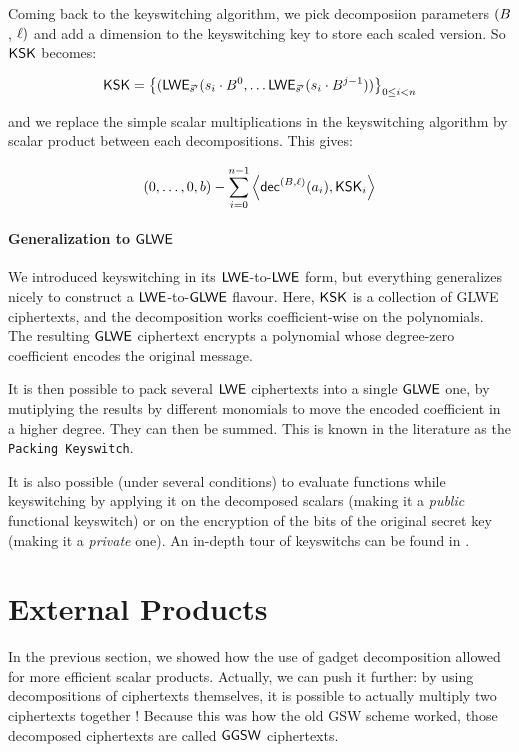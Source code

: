 Coming back to the keyswitching algorithm, we pick decomposiion parameters $(B$, $\ell)$ and add a dimension to the keyswitching key to store each scaled version. So $\textsf{KSK}$ becomes:

\[
	\textsf{KSK} = \left \lbrace ( \textsf{LWE}_{\vec s'} (s_i \cdot B^0, \dots  \textsf{LWE}_{\vec s'} (s_i \cdot B^{j-1}) ) \right \rbrace_{0 \le i < n}
\]


and we replace the simple scalar multiplications in the keyswitching algorithm by scalar product between each decompositions. This gives:

\[
	(0, \dots, 0, b) - \sum_{i=0}^{n-1} \left \langle \textsf{dec}^{(B, \ell)}(a_i), \textsf{KSK}_i \right \rangle
\]




\paragraph{Generalization to $\textsf{GLWE}$}


We introduced keyswitching in its $\textsf{LWE}$-to-$\textsf{LWE}$ form, but everything generalizes nicely to construct a $\textsf{LWE}$-to-$\textsf{GLWE}$ flavour. Here, $\textsf{KSK}$ is a collection of GLWE ciphertexts, and the decomposition works coefficient-wise on the polynomials. The resulting $\textsf{GLWE}$ ciphertext encrypts a polynomial whose degree-zero coefficient encodes the original message.

It is then possible to pack several $\textsf{LWE}$ ciphertexts into a single $\textsf{GLWE}$ one, by mutiplying the results by different monomials to move the encoded coefficient in a higher degree. They can then be summed. This is known in the literature as the \texttt{Packing Keyswitch}.

It is also possible (under several conditions) to evaluate functions while keyswitching by applying it on the decomposed scalars (making it a \textit{public} functional keyswitch) or on the encryption of the bits of the original secret key (making it a \textit{private} one). An in-depth tour of keyswitchs can be found in \cite{these_tap}.


\section{External Products}
\label{sec:external_products}

In the previous section, we showed how the use of gadget decomposition allowed for more efficient scalar products. Actually, we can push it further: by using decompositions of ciphertexts themselves, it is possible to actually multiply two ciphertexts together ! Because this was how the old GSW scheme \cite{C:GenSahWat13} worked, those decomposed ciphertexts are called $\textsf{GGSW}$ ciphertexts.

